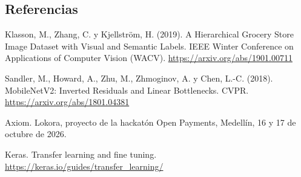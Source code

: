\documentclass[11pt,a4paper]{article}
\begin{document}
\subsection*{Referencias}
\noindent [1] Klasson, M., Zhang, C. y Kjellström, H. (2019). A Hierarchical Grocery Store Image Dataset with Visual and Semantic Labels. IEEE Winter Conference on Applications of Computer Vision (WACV). \url{https://arxiv.org/abs/1901.00711}\par
\noindent [2] Sandler, M., Howard, A., Zhu, M., Zhmoginov, A. y Chen, L.-C. (2018). MobileNetV2: Inverted Residuals and Linear Bottlenecks. CVPR. \url{https://arxiv.org/abs/1801.04381}\par
\noindent [6] Axiom. Lokora, proyecto de la hackatón Open Payments, Medellín, 16 y 17 de octubre de 2026.\par
\noindent [7] Keras. Transfer learning and fine tuning. \url{https://keras.io/guides/transfer_learning/}\par
\end{document}
